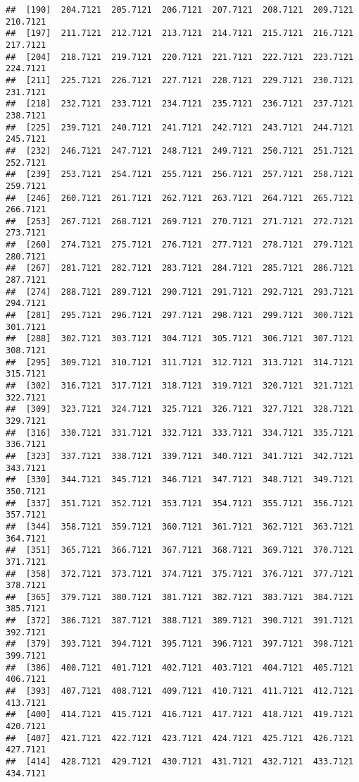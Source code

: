 \documentclass[
]{article}
\begin{document}
\begin{verbatim}
##  [190]  204.7121  205.7121  206.7121  207.7121  208.7121  209.7121  210.7121
##  [197]  211.7121  212.7121  213.7121  214.7121  215.7121  216.7121  217.7121
##  [204]  218.7121  219.7121  220.7121  221.7121  222.7121  223.7121  224.7121
##  [211]  225.7121  226.7121  227.7121  228.7121  229.7121  230.7121  231.7121
##  [218]  232.7121  233.7121  234.7121  235.7121  236.7121  237.7121  238.7121
##  [225]  239.7121  240.7121  241.7121  242.7121  243.7121  244.7121  245.7121
##  [232]  246.7121  247.7121  248.7121  249.7121  250.7121  251.7121  252.7121
##  [239]  253.7121  254.7121  255.7121  256.7121  257.7121  258.7121  259.7121
##  [246]  260.7121  261.7121  262.7121  263.7121  264.7121  265.7121  266.7121
##  [253]  267.7121  268.7121  269.7121  270.7121  271.7121  272.7121  273.7121
##  [260]  274.7121  275.7121  276.7121  277.7121  278.7121  279.7121  280.7121
##  [267]  281.7121  282.7121  283.7121  284.7121  285.7121  286.7121  287.7121
##  [274]  288.7121  289.7121  290.7121  291.7121  292.7121  293.7121  294.7121
##  [281]  295.7121  296.7121  297.7121  298.7121  299.7121  300.7121  301.7121
##  [288]  302.7121  303.7121  304.7121  305.7121  306.7121  307.7121  308.7121
##  [295]  309.7121  310.7121  311.7121  312.7121  313.7121  314.7121  315.7121
##  [302]  316.7121  317.7121  318.7121  319.7121  320.7121  321.7121  322.7121
##  [309]  323.7121  324.7121  325.7121  326.7121  327.7121  328.7121  329.7121
##  [316]  330.7121  331.7121  332.7121  333.7121  334.7121  335.7121  336.7121
##  [323]  337.7121  338.7121  339.7121  340.7121  341.7121  342.7121  343.7121
##  [330]  344.7121  345.7121  346.7121  347.7121  348.7121  349.7121  350.7121
##  [337]  351.7121  352.7121  353.7121  354.7121  355.7121  356.7121  357.7121
##  [344]  358.7121  359.7121  360.7121  361.7121  362.7121  363.7121  364.7121
##  [351]  365.7121  366.7121  367.7121  368.7121  369.7121  370.7121  371.7121
##  [358]  372.7121  373.7121  374.7121  375.7121  376.7121  377.7121  378.7121
##  [365]  379.7121  380.7121  381.7121  382.7121  383.7121  384.7121  385.7121
##  [372]  386.7121  387.7121  388.7121  389.7121  390.7121  391.7121  392.7121
##  [379]  393.7121  394.7121  395.7121  396.7121  397.7121  398.7121  399.7121
##  [386]  400.7121  401.7121  402.7121  403.7121  404.7121  405.7121  406.7121
##  [393]  407.7121  408.7121  409.7121  410.7121  411.7121  412.7121  413.7121
##  [400]  414.7121  415.7121  416.7121  417.7121  418.7121  419.7121  420.7121
##  [407]  421.7121  422.7121  423.7121  424.7121  425.7121  426.7121  427.7121
##  [414]  428.7121  429.7121  430.7121  431.7121  432.7121  433.7121  434.7121

\end{verbatim}
\end{document}
